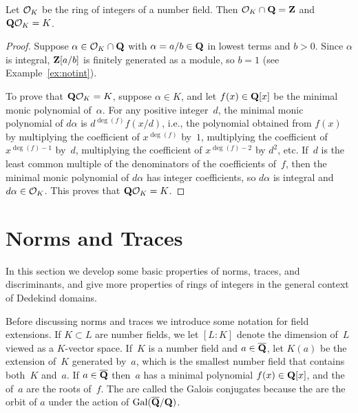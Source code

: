 \begin{lemma}\label{lem:intq}
Let $\mathcal{O}_K$ be the ring of integers of a number field.  Then 
$\mathcal{O}_K\cap \mathbf{Q} = \mathbf{Z}$ and $\mathbf{Q}\mathcal{O}_K = K$.
\end{lemma}
\begin{proof}
  Suppose $\alpha\in \mathcal{O}_K\cap\mathbf{Q}$ with $\alpha=a/b \in \mathbf{Q}$ in lowest
  terms and $b>0$.  Since $\alpha$ is integral, $\mathbf{Z}[a/b]$ is finitely
  generated as a module, so $b=1$ (see Example~\ref{ex:notint}).

To prove that $\mathbf{Q}\mathcal{O}_K=K$, suppose $\alpha\in K$, and let
$f(x)\in\mathbf{Q}[x]$ be the minimal monic polynomial of~$\alpha$.  For any
positive integer~$d$, the minimal monic polynomial of $d\alpha$ is
$d^{\deg(f)}f(x/d)$, i.e., the polynomial obtained from $f(x)$ by
multiplying the coefficient of $x^{\deg(f)}$ by~$1$, multiplying the
coefficient of $x^{\deg(f)-1}$ by~$d$, multiplying the coefficient of
$x^{\deg(f)-2}$ by $d^2$, etc.  If~$d$ is the least common multiple of
the denominators of the coefficients of~$f$, then the minimal monic
polynomial of $d\alpha$ has integer coefficients, so $d\alpha$ is
integral and $d\alpha\in \mathcal{O}_K$.  This proves that $\mathbf{Q}\mathcal{O}_K = K$.
\end{proof}

\section{Norms and Traces}
In this section we develop some basic properties of norms, traces, and
discriminants, and give more properties of rings of integers in the
general context of Dedekind domains.

Before discussing norms and traces we introduce some notation for
field extensions.  If $K\subset L$ are number fields, we let $[L:K]$
denote the dimension of~$L$ viewed as a $K$-vector space.  If~$K$ is a
number field and $a\in \overline{\mathbf{Q}}$, let $K(a)$ be the extension of~$K$
generated by~$a$, which is the smallest number field that contains
both~$K$ and~$a$.  If $a\in\overline{\mathbf{Q}}$ then~$a$ has a minimal polynomial
$f(x)\in\mathbf{Q}[x]$, and the  of~$a$ are the roots
of~$f$. The are called the Galois conjugates because the are the orbit
of $a$ under the action of $\operatorname{Gal}(\overline{\mathbf{Q}}/\mathbf{Q})$.  

